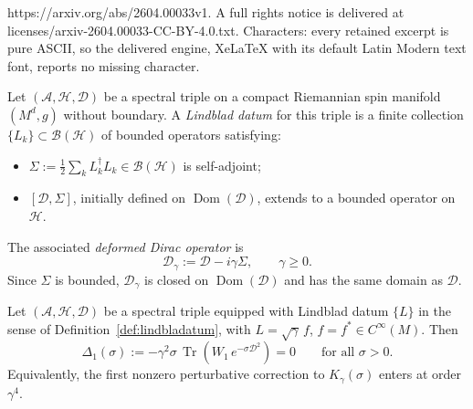 \documentclass[10pt,a4paper]{amsart}
\newcommand{\Dg}{\mathcal{D}_\gamma}
\newcommand{\Dom}{\operatorname{Dom}}
\newcommand{\Sig}{\Sigma}
\newcommand{\Tr}{\operatorname{Tr}}
\newcommand{\cA}{\mathcal{A}}
\newcommand{\cD}{\mathcal{D}}
\newcommand{\cH}{\mathcal{H}}
\begin{document}
https://arxiv.org/abs/2604.00033v1. A full rights notice is delivered at licenses/arxiv-2604.00033-CC-BY-4.0.txt. Characters: every retained excerpt is pure ASCII, so the delivered engine, XeLaTeX with its default Latin Modern text font, reports no missing character.
\begin{Definition}
\label{def:lindbladatum}
Let $(\cA, \cH, \cD)$ be a spectral triple on a compact Riemannian spin
manifold $(M^d, g)$ without boundary. A \emph{Lindblad datum} for this
triple is a finite collection $\{L_k\} \subset \mathcal{B}(\cH)$ of
bounded operators satisfying:
\begin{itemize}[leftmargin=2.2em]
  \item[(H1)] $\Sig := \tfrac{1}{2}\sum_k L_k^\dagger L_k \in
              \mathcal{B}(\cH)$ is self-adjoint;
  \item[(H2)] $[\cD, \Sig]$, initially defined on $\Dom(\cD)$, extends
              to a bounded operator on $\cH$.
\end{itemize}
The associated \emph{deformed Dirac operator} is
\begin{equation}
\Dg:=\cD-i\gamma\Sig, \qquad \gamma\ge 0.
\end{equation}
Since $\Sig$ is bounded, $\Dg$ is closed on $\Dom(\cD)$ and has the same
domain as $\cD$.
\end{Definition}

\begin{Proposition}
\label{prop:vanishing}
Let $(\cA, \cH, \cD)$ be a spectral triple equipped with Lindblad datum
$\{L\}$ in the sense of Definition~\ref{def:lindbladatum}, with
$L = \sqrt{\gamma}\,f$, $f = f^* \in C^\infty(M)$. Then
\begin{equation}
  \Delta_1(\sigma) := -\gamma^2\sigma\,
  \Tr\!\left(W_1\,e^{-\sigma\cD^2}\right) = 0
  \qquad \text{for all } \sigma > 0.
\end{equation}
Equivalently, the first nonzero perturbative correction to
$K_\gamma(\sigma)$ enters at order $\gamma^4$.
\end{Proposition}
\end{document}
